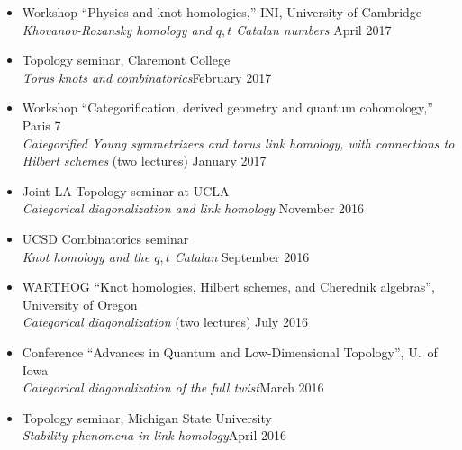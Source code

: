 \documentclass[12pt]{amsart}
\renewcommand{\j}{\indent}
\newcommand{\conf}{}%
\begin{document}
\begin{itemize}
\item[$\cdot$]Workshop ``Physics and knot homologies,'' INI, University of Cambridge\\
\j \emph{Khovanov-Rozansky homology and $q,t$ Catalan numbers} \hfill April 2017



\item[$\cdot$]Topology seminar, Claremont College\\
\j \emph{Torus knots and combinatorics}\hfill February 2017


\item[$\cdot$]Workshop  ``Categorification, derived geometry and quantum cohomology,'' Paris 7\\
\j \emph{Categorified Young symmetrizers and torus link homology, with
 connections to\\
 \j Hilbert schemes} (two lectures)  \hfill  January 2017


\item[$\cdot$]Joint LA Topology seminar at UCLA\\
\j\emph{Categorical diagonalization and link homology} \hfill  November 2016

\item[$\cdot$]UCSD Combinatorics seminar\\
\j \emph{Knot homology and the $q,t$ Catalan} \hfill September 2016


\item[$\cdot$]WARTHOG ``Knot homologies, Hilbert schemes, and Cherednik algebras'', University of Oregon\\
\j \emph{Categorical diagonalization} (two lectures) \hfill July 2016 

\item[$\cdot$]Conference ``Advances in Quantum and Low-Dimensional Topology'',  U.~of Iowa \\
\j\emph{Categorical diagonalization of the full twist}\hfill March 2016


\item[$\cdot$]Topology seminar, Michigan State University\\
\j \emph{Stability phenomena in link homology}\hfill April 2016


\end{itemize}
\end{document}
